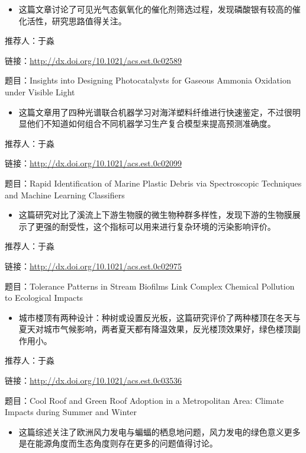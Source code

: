 \documentclass[
]{book}
\providecommand{\tightlist}{%
  \setlength{\itemsep}{0pt}\setlength{\parskip}{0pt}}
\begin{document}
\begin{itemize}
\tightlist
\item
  这篇文章讨论了可见光气态氨氧化的催化剂筛选过程，发现磷酸银有较高的催化活性，研究思路值得关注。
\end{itemize}

推荐人：于淼

链接：\url{http://dx.doi.org/10.1021/acs.est.0c02589}

题目：Insights into Designing Photocatalysts for Gaseous Ammonia Oxidation under Visible Light

\begin{itemize}
\tightlist
\item
  这篇文章用了四种光谱联合机器学习对海洋塑料纤维进行快速鉴定，不过很明显他们不知道如何组合不同机器学习生产复合模型来提高预测准确度。
\end{itemize}

推荐人：于淼

链接：\url{http://dx.doi.org/10.1021/acs.est.0c02099}

题目：Rapid Identification of Marine Plastic Debris via Spectroscopic Techniques and Machine Learning Classifiers

\begin{itemize}
\tightlist
\item
  这篇研究对比了溪流上下游生物膜的微生物种群多样性，发现下游的生物膜展示了更强的耐受性，这个指标可以用来进行复杂环境的污染影响评价。
\end{itemize}

推荐人：于淼

链接：\url{http://dx.doi.org/10.1021/acs.est.0c02975}

题目：Tolerance Patterns in Stream Biofilms Link Complex Chemical Pollution to Ecological Impacts

\begin{itemize}
\tightlist
\item
  城市楼顶有两种设计：种树或设置反光板，这篇研究评价了两种楼顶在冬天与夏天对城市气候影响，两者夏天都有降温效果，反光楼顶效果好，绿色楼顶副作用小。
\end{itemize}

推荐人：于淼

链接：\url{http://dx.doi.org/10.1021/acs.est.0c03536}

题目：Cool Roof and Green Roof Adoption in a Metropolitan Area: Climate Impacts during Summer and Winter

\begin{itemize}
\tightlist
\item
  这篇综述关注了欧洲风力发电与蝙蝠的栖息地问题，风力发电的绿色意义更多是在能源角度而生态角度则存在更多的问题值得讨论。
\end{itemize}
\end{document}
